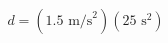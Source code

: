 \documentclass[preview]{standalone}
\begin{document}
\begin{align*}
d = (1.5 \text{ m/s}^2)(25 \text{ s}^2)
\end{align*}
\end{document}
